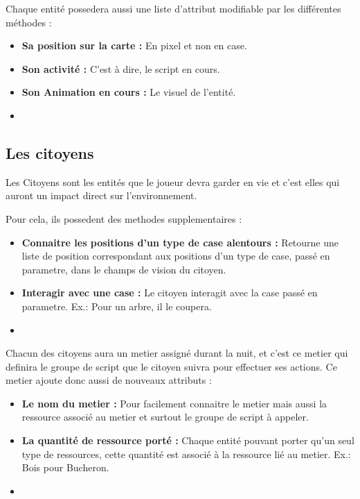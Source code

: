 \documentclass[a4paper]{article}
\begin{document}
		Chaque entité possedera aussi une liste d'attribut modifiable par les différentes méthodes : 
		\begin{itemize}
            \item \textbf{Sa position sur la carte : } En pixel et non en case.
            \item \textbf{Son activité : } C'est à dire, le script en cours.
            \item \textbf{Son Animation en cours : } Le visuel de l'entité.
            \item \textbf{}
		\end{itemize}
		
		\subsection{Les citoyens}
			Les Citoyens sont les entités que le joueur devra garder en vie et c'est elles qui auront un impact direct sur l'environnement.
			
			Pour cela, ils possedent des methodes supplementaires :
			\begin{itemize}
				\item \textbf{Connaitre les positions d'un type de case alentours : } Retourne une liste de position correspondant aux positions d'un type de case, passé en parametre, dans le champs de vision du citoyen.
				\item \textbf{Interagir avec une case : } Le citoyen interagit avec la case passé en parametre. Ex.: Pour un arbre, il le coupera.
				\item \textbf{}
			\end{itemize}
			
			Chacun des citoyens aura un metier assigné durant la nuit, et c'est ce metier qui definira le groupe de script que le citoyen suivra pour effectuer ses actions. Ce metier ajoute donc aussi de nouveaux attributs :
			\begin{itemize}
				\item \textbf{Le nom du metier : } Pour facilement connaitre le metier mais aussi la ressource associé au metier et surtout le groupe de script à appeler.
				\item \textbf{La quantité de ressource porté : } Chaque entité pouvant porter qu'un seul type de ressources, cette quantité est associé à la ressource lié au metier. Ex.: Bois pour Bucheron.
				\item \textbf{}
			\end{itemize}
		
\end{document}
